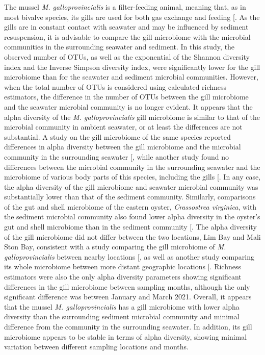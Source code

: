 \documentclass[
  12 pt,
]{article}
\begin{document}
The mussel \emph{M. galloprovincialis} is a filter-feeding animal, meaning that, as in most bivalve species, its gills are used for both gas exchange and feeding {[}\citeproc{ref-Gosling2003a}{37}{]}. As the gills are in constant contact with seawater and may be influenced by sediment resuspension, it is advisable to compare the gill microbiome with the microbial communities in the surrounding seawater and sediment. In this study, the observed number of OTUs, as well as the exponential of the Shannon diversity index and the Inverse Simpson diversity index, were significantly lower for the gill microbiome than for the seawater and sediment microbial communities. However, when the total number of OTUs is considered using calculated richness estimators, the difference in the number of OTUs between the gill microbiome and the seawater microbial community is no longer evident. It appears that the alpha diversity of the \emph{M. galloprovincialis} gill microbiome is similar to that of the microbial community in ambient seawater, or at least the differences are not substantial. A study on the gill microbiome of the same species reported differences in alpha diversity between the gill microbiome and the microbial community in the surrounding seawater {[}\citeproc{ref-Zardinoni2024}{31}{]}, while another study found no differences between the microbial community in the surrounding seawater and the microbiome of various body parts of this species, including the gills {[}\citeproc{ref-Musella2020}{13}{]}. In any case, the alpha diversity of the gill microbiome and seawater microbial community was substantially lower than that of the sediment community. Similarly, comparisons of the gut and shell microbiome of the eastern oyster, \emph{Crassostrea virginica}, with the sediment microbial community also found lower alpha diversity in the oyster's gut and shell microbiome than in the sediment community {[}\citeproc{ref-Arfken2017}{11}{]}. The alpha diversity of the gill microbiome did not differ between the two locations, Lim Bay and Mali Ston Bay, consistent with a study comparing the gill microbiome of \emph{M. galloprovincialis} between nearby locations {[}\citeproc{ref-Zardinoni2024}{31}{]}, as well as another study comparing its whole microbiome between more distant geographic locations {[}\citeproc{ref-Peruzzo2026}{23}{]}. Richness estimators were also the only alpha diversity parameters showing significant differences in the gill microbiome between sampling months, although the only significant difference was between January and March 2021. Overall, it appears that the mussel \emph{M. galloprovincialis} has a gill microbiome with lower alpha diversity than the surrounding sediment microbial community and minimal difference from the community in the surrounding seawater. In addition, its gill microbiome appears to be stable in terms of alpha diversity, showing minimal variation between different sampling locations and months.
\end{document}
